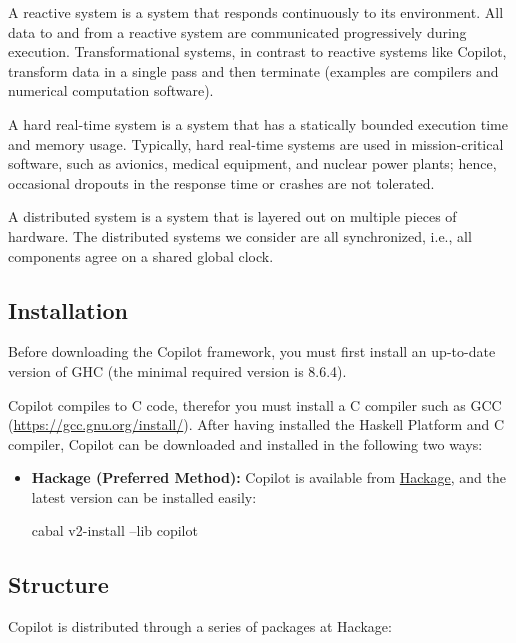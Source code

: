 A reactive system is a system that responds continuously to its environment.
%
All data to and from a reactive system are communicated progressively during
execution.
%
Transformational systems, in contrast to reactive systems like Copilot,
transform data in a single pass and then terminate (examples are compilers and
numerical computation software).
%

A hard real-time system is a system that has a statically bounded execution
time and memory usage.
%
 Typically, hard real-time systems are used in mission-critical software, such
as avionics, medical equipment, and nuclear power plants; hence, occasional
dropouts in the response time or crashes are not tolerated.

A distributed system is a system that is layered out on multiple pieces of
hardware.
%
The distributed systems we consider are all synchronized, i.e., all components
agree on a shared global clock.


\subsection{Installation} \label{sec:install}

Before downloading the Copilot framework, you must first install an
up-to-date version of GHC (the minimal required version is 8.6.4).
%

\noindent Copilot compiles to C code, therefor you must install a C compiler such as GCC (\url{https://gcc.gnu.org/install/}). After having installed the Haskell Platform and C compiler, Copilot can be downloaded and
installed in the following two ways:

\begin{itemize}
\item \textbf{Hackage (Preferred Method): } Copilot is available from
\href{https://hackage.haskell.org/package/copilot-3.16#table-of-contents}{Hackage},
and the latest version can be installed easily:
\begin{code}
cabal v2-install --lib copilot
\end{code}

\end{itemize}


\subsection{Structure} \label{structure}

\noindent Copilot is distributed through a series of packages at Hackage:


